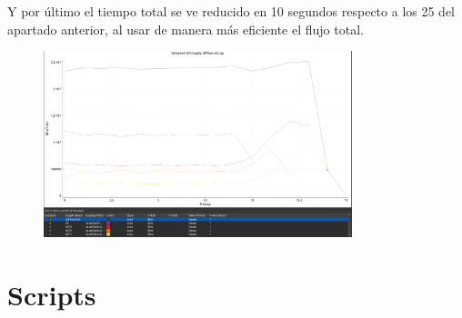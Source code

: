\documentclass[12pt, a4paper]{report}
\begin{document}
\begin{enumerate}
	Y por último el tiempo total se ve reducido en 10 segundos respecto a los 25 del apartado anterior, al usar de manera más eficiente el flujo total.
	\begin{figure}[H]
		\centering
		\includegraphics[width=0.8\textwidth]{ej2.2_5}
	\end{figure}
\end{enumerate}
\chapter{Scripts}







\end{document}
